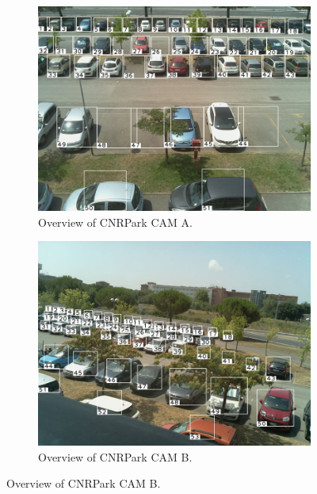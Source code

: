 \begin{figure}
    \centering
    \begin{subfigure}[b]{0.49\columnwidth}
        \includegraphics[width=\columnwidth]{camera-a-overview}
        \caption{Overview of CNRPark CAM A.}
        \label{fig:mini:cam-a}
    \end{subfigure} %
    \begin{subfigure}[b]{0.49\columnwidth}
        \includegraphics[width=\columnwidth]{camera-b-overview}
        \caption{Overview of CNRPark CAM B.}
        \label{fig:mini:cam-b}
    \end{subfigure}


\end{figure}

